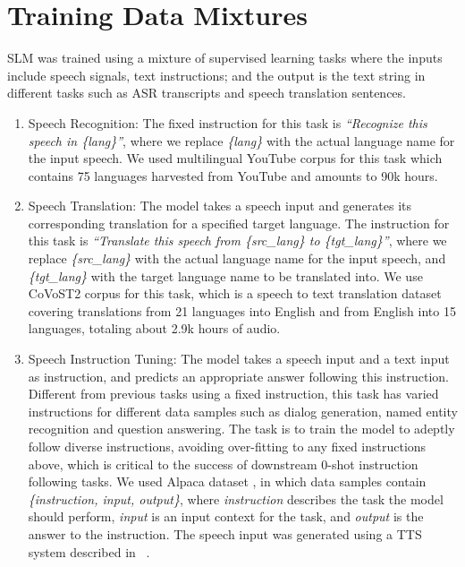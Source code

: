 \section{Training Data Mixtures}

\label{sec:data_tasks}
SLM was trained using a mixture of supervised learning tasks where the inputs include speech signals, text instructions; and the output is the text string in different tasks such as ASR transcripts and speech translation sentences.
\begin{enumerate}
\itemsep 0in
    \item Speech Recognition: The fixed instruction for this task is {\em ``Recognize this speech in \{lang\}''}, where we replace {\em\{lang\}} with the actual language name for the input speech. We used multilingual YouTube corpus \cite{zhang2023google} for this task which contains 75 languages harvested from YouTube and amounts to 90k hours.
    \item Speech Translation: The model takes a speech input and generates its corresponding translation for a specified target language. The instruction for this task is {\em ``Translate this speech from \{src\_lang\} to \{tgt\_lang\}''}, where we replace {\em\{src\_lang\}} with the actual language name for the input speech, and {\em\{tgt\_lang\}} with the target language name to be translated into. We use CoVoST2 corpus \cite{wang2020covost} for this task, which is a speech to text translation dataset covering translations from 21 languages into English and from English into 15 languages, totaling about 2.9k hours of audio.
    \item Speech Instruction Tuning: The model takes a speech input and a text input as instruction, and predicts an appropriate answer following this instruction. Different from previous tasks using a fixed instruction, this task has varied instructions for different data samples such as dialog generation, named entity recognition and question answering. The task is to train the model to adeptly follow diverse instructions, avoiding over-fitting to any fixed instructions above, which is critical to the success of downstream 0-shot instruction following tasks. We used Alpaca dataset \cite{alpaca}, in which data samples contain {\em \{instruction, input, output\}}, where {\em instruction} describes the task the model should perform, {\em input} is an input context for the task, and {\em output} is the answer to the instruction. The speech input was generated using a TTS system described in ~\cite{JiaTTS2021, shenTTS2021}.
\end{enumerate}

